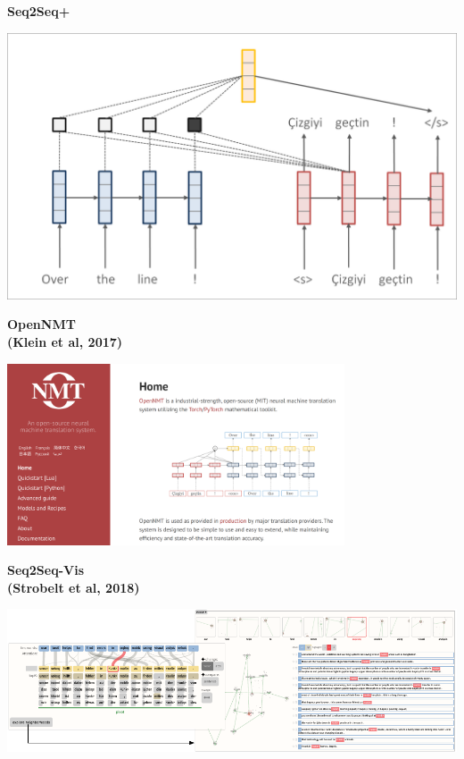 \documentclass[aspectratio=169]{beamer}
\newcommand{\air}{\vspace{0.25cm}}
\begin{document}
\begin{frame}
  \begin{center}
    \textbf{Seq2Seq+} \air

  \end{center}
\center
\vspace{-5mm}
 \air
\includegraphics[scale=0.37]{nmt-attn10}
\end{frame}

\begin{frame}
  \begin{center}
    \textbf{OpenNMT\\ {\small (Klein et al, 2017)}}
  \end{center}

  \includegraphics[width=10cm]{opennmt}
\end{frame}

\begin{frame}
  \begin{center}
    \textbf{Seq2Seq-Vis \\ {\small (Strobelt et al, 2018)} }
  \end{center}

  \includegraphics[width=\textwidth]{s2stease}
\end{frame}
\end{document}
